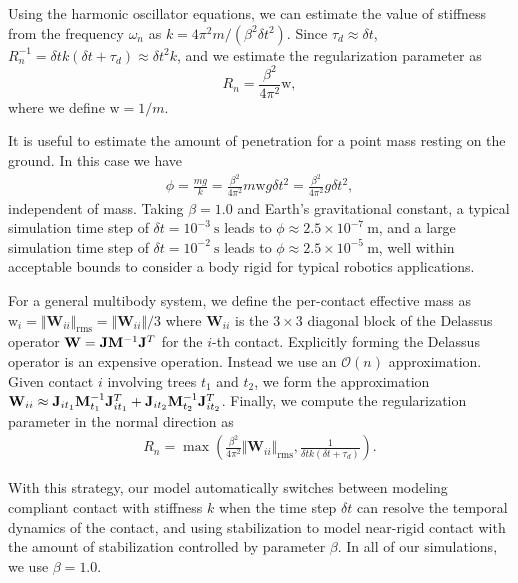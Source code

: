 Using the harmonic oscillator equations, we can estimate the value of stiffness
from the frequency $\omega_n$ as $k=4\pi^2 m/(\beta^2 \delta t^2)$. Since
$\tau_d\approx\delta t$, $R_n^{-1} = \delta t k(\delta t+\tau_d) \approx \delta
t^2k$, and we estimate the regularization parameter as
\begin{equation*}
	R_n = \frac{\beta^2}{4\pi^2}\text{w},
\end{equation*}
where we define $\text{w}=1/m$.

It is useful to estimate the amount of penetration for a point mass resting on
the ground. In this case we have
\begin{align*}
	\phi = \frac{mg}{k} = \frac{\beta^2}{4\pi^2}m\text{w}g\delta t^2 = \frac{\beta^2}{4\pi^2}g\delta t^2,
\end{align*}
independent of mass. Taking $\beta=1.0$ and Earth's gravitational constant, a
typical simulation time step of $\delta t=10^{-3}~\text{s}$ leads to
$\phi\approx 2.5\times 10^{-7}~\text{m}$, and a large simulation time step of
$\delta t=10^{-2}~\text{s}$ leads to $\phi\approx 2.5\times 10^{-5}~\text{m}$,
well within acceptable bounds to consider a body rigid for typical robotics
applications.

For a general multibody system, we define the per-contact effective mass as
$\text{w}_i=\Vert\mathbf{W}_{ii}\Vert_\text{rms}=\Vert\mathbf{W}_{ii}\Vert/3$
where $\mathbf{W}_{ii}$ is the $3\times 3$ diagonal block of the Delassus
operator $\mathbf{W}={\mathbf{J}}{\mathbf{M}}^{-1}{\mathbf{J}}^T$ for the $i$-th contact.
Explicitly forming the Delassus operator is an expensive operation. Instead we
use an $\mathcal{O}(n)$ approximation. Given contact $i$ involving trees $t_1$
and $t_2$, we form the approximation $\mathbf{W}_{ii}\approx{\mathbf{J}}_{i
t_1}{\mathbf{M}}_{t_1}^{-1}{\mathbf{J}}_{i t_1}^T+{\mathbf{J}}_{i t_2}{\mathbf{M}}_{t_2}^{-1}{\mathbf{J}}_{i
t_2}^T$. Finally, we compute the
regularization parameter in the normal direction as
\begin{eqnarray}
    R_n = \max\left(\frac{\beta^2}{4\pi^2}\Vert\mathbf{W}_{ii}\Vert_\text{rms},
    \frac{1}{\delta t k(\delta t+\tau_d)}\right)
    \label{eq:normal_regularization}.
\end{eqnarray}

With this strategy, our model automatically switches between modeling compliant
contact with stiffness $k$ when the time step $\delta t$ can resolve the
temporal dynamics of the contact, and using stabilization to model near-rigid
contact with the amount of stabilization controlled by parameter $\beta$. In all
of our simulations, we use $\beta=1.0$.

